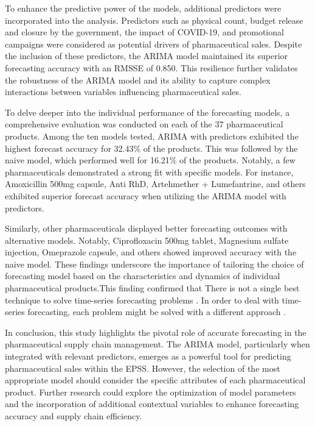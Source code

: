 \documentclass[
  authoryear,
  preprint,
  3p]{elsarticle}
\begin{document}
To enhance the predictive power of the models, additional predictors
were incorporated into the analysis. Predictors such as physical count,
budget release and closure by the government, the impact of COVID-19,
and promotional campaigns were considered as potential drivers of
pharmaceutical sales. Despite the inclusion of these predictors, the
ARIMA model maintained its superior forecasting accuracy with an RMSSE
of 0.850. This resilience further validates the robustness of the ARIMA
model and its ability to capture complex interactions between variables
influencing pharmaceutical sales.

To delve deeper into the individual performance of the forecasting
models, a comprehensive evaluation was conducted on each of the 37
pharmaceutical products. Among the ten models tested, ARIMA with
predictors exhibited the highest forecast accuracy for 32.43\% of the
products. This was followed by the naive model, which performed well for
16.21\% of the products. Notably, a few pharmaceuticals demonstrated a
strong fit with specific models. For instance, Amoxicillin 500mg
capsule, Anti RhD, Artehmether + Lumefantrine, and others exhibited
superior forecast accuracy when utilizing the ARIMA model with
predictors.

Similarly, other pharmaceuticals displayed better forecasting outcomes
with alternative models. Notably, Ciprofloxacin 500mg tablet, Magnesium
sulfate injection, Omeprazole capsule, and others showed improved
accuracy with the naive model. These findings underscore the importance
of tailoring the choice of forecasting model based on the
characteristics and dynamics of individual pharmaceutical products.This
finding confirmed that There is not a single best technique to solve
time-series forecasting problems \citep{zhang2007quarterly}. In order to
deal with time-series forecasting, each problem might be solved with a
different approach \citep{ensafi2022time}.

In conclusion, this study highlights the pivotal role of accurate
forecasting in the pharmaceutical supply chain management. The ARIMA
model, particularly when integrated with relevant predictors, emerges as
a powerful tool for predicting pharmaceutical sales within the EPSS.
However, the selection of the most appropriate model should consider the
specific attributes of each pharmaceutical product. Further research
could explore the optimization of model parameters and the incorporation
of additional contextual variables to enhance forecasting accuracy and
supply chain efficiency.
\end{document}
